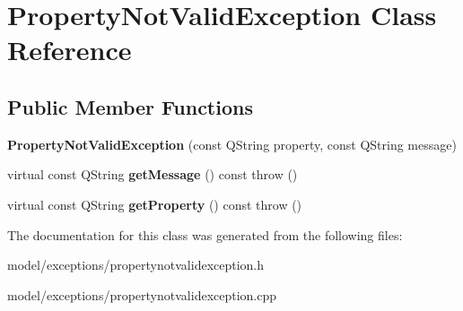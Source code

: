 \section{\-Property\-Not\-Valid\-Exception \-Class \-Reference}
\label{d8/df5/classPropertyNotValidException}
\subsection*{\-Public \-Member \-Functions}
\begin{DoxyCompactItemize}
\item 
{\bfseries \-Property\-Not\-Valid\-Exception} (const \-Q\-String property, const \-Q\-String message)\label{d8/df5/classPropertyNotValidException_a1597e12c33e8b6080dbf3bd057e03bb8}

\item 
virtual const \-Q\-String {\bfseries get\-Message} () const   throw ()\label{d8/df5/classPropertyNotValidException_a66d861efc67428d56e0196f8f5b33d26}

\item 
virtual const \-Q\-String {\bfseries get\-Property} () const   throw ()\label{d8/df5/classPropertyNotValidException_afce6ddb37d69ac02017d4f7300cdaee1}

\end{DoxyCompactItemize}


\-The documentation for this class was generated from the following files\-:\begin{DoxyCompactItemize}
\item 
model/exceptions/propertynotvalidexception.\-h\item 
model/exceptions/propertynotvalidexception.\-cpp\end{DoxyCompactItemize}
